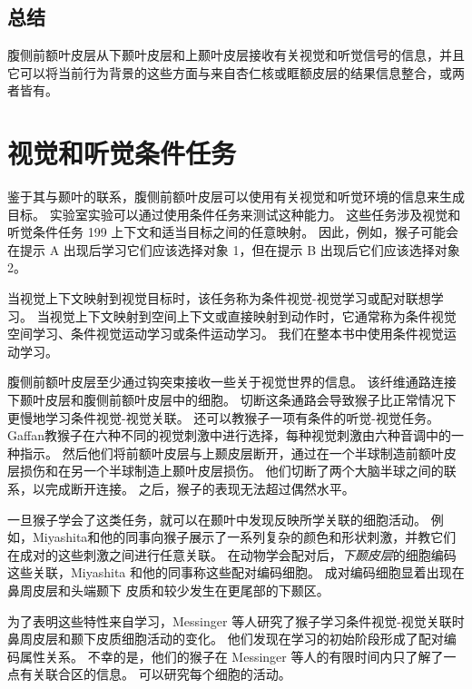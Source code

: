 \subsection{总结}
腹侧前额叶皮层从下颞叶皮层和上颞叶皮层接收有关视觉和听觉信号的信息，并且它可以将当前行为背景的这些方面与来自杏仁核或眶额皮层的结果信息整合\cite{barbas1989architecture}，或两者皆有。


\section{视觉和听觉条件任务}
\par
鉴于其与颞叶的联系，腹侧前额叶皮层可以使用有关视觉和听觉环境的信息来生成目标。 
实验室实验可以通过使用条件任务来测试这种能力。 
这些任务涉及视觉和听觉条件任务 199 上下文和适当目标之间的任意映射。
因此，例如，猴子可能会在提示 A 出现后学习它们应该选择对象 1，但在提示 B 出现后它们应该选择对象 2。
\par


当视觉上下文映射到视觉目标时，该任务称为条件视觉-视觉学习或配对联想学习。 
当视觉上下文映射到空间上下文或直接映射到动作时，它通常称为条件视觉空间学习、条件视觉运动学习或条件运动学习。
我们在整本书中使用条件视觉运动学习。
\par


腹侧前额叶皮层至少通过钩突束接收一些关于视觉世界的信息。 
该纤维通路连接下颞叶皮层和腹侧前额叶皮层中的细胞\cite{ungerleider1989projections}。 
切断这条通路会导致猴子比正常情况下更慢地学习条件视觉-视觉关联\cite{eacott1992inferotemporal,gutnikov1997temporo}。
还可以教猴子一项有条件的听觉-视觉任务。 
Gaffan\cite{gaffan1991auditory}教猴子在六种不同的视觉刺激中进行选择，每种视觉刺激由六种音调中的一种指示。 
然后他们将前额叶皮层与上颞皮层断开，通过在一个半球制造前额叶皮层损伤和在另一个半球制造上颞叶皮层损伤。 
他们切断了两个大脑半球之间的联系，以完成断开连接。 
之后，猴子的表现无法超过偶然水平。
\par


一旦猴子学会了这类任务，就可以在颞叶中发现反映所学关联的细胞活动。 
例如，Miyashita和他的同事向猴子展示了一系列复杂的颜色和形状刺激，并教它们在成对的这些刺激之间进行任意关联\cite{sakai1991neural,naya1996activity}。
在动物学会配对后，\textit{下颞皮层}的细胞编码这些关联，Miyashita 和他的同事称这些配对编码细胞。 
成对编码细胞显着出现在鼻周皮层和头端颞下
皮质和较少发生在更尾部的下颞区\cite{naya2001backward}。
\par


为了表明这些特性来自学习，Messinger 等人\cite{messinger2001neuronal}研究了猴子学习条件视觉-视觉关联时鼻周皮层和颞下皮质细胞活动的变化。 
他们发现在学习的初始阶段形成了配对编码属性关系。 
不幸的是，他们的猴子在 Messinger 等人的有限时间内只了解了一点有关联合区的信息。 
可以研究每个细胞的活动。
\par


